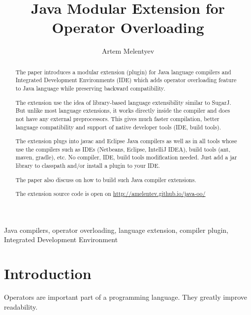 \documentclass{aircc}
\begin{document}
\title{
Java Modular Extension for \\ 
Operator Overloading
}

\author{Artem Melentyev}

\maketitle

\begin{abstract}
The paper introduces a modular extension (plugin) for Java language compilers and Integrated Development Environments (IDE)
which adds operator overloading feature to Java language while preserving backward compatibility.

The extension use the idea of library-based language extensibility similar to SugarJ\cite{sugarj}.
But unlike most language extensions, it works directly inside the compiler and does not have any external preprocessors.
This gives much faster compilation, better language compatibility and
support of native developer tools (IDE, build tools).

The extension plugs into javac and Eclipse Java compilers 
as well as in all tools whose use the compilers such as IDEs (Netbeans, Eclipse, IntelliJ IDEA), build tools (ant, maven, gradle), etc.
No compiler, IDE, build tools modification needed. Just add a jar library to classpath and/or install a plugin to your IDE.

The paper also discuss on how to build such Java compiler extensions.

The extension source code is open on 
\url{http://amelentev.github.io/java-oo/}
\end{abstract}

\begin{keywords}
Java compilers, operator overloading, language extension, compiler plugin, Integrated Development Environment
\end{keywords}

\section{Introduction}
Operators are important part of a programming language.
They greatly improve readability.
\end{document}
